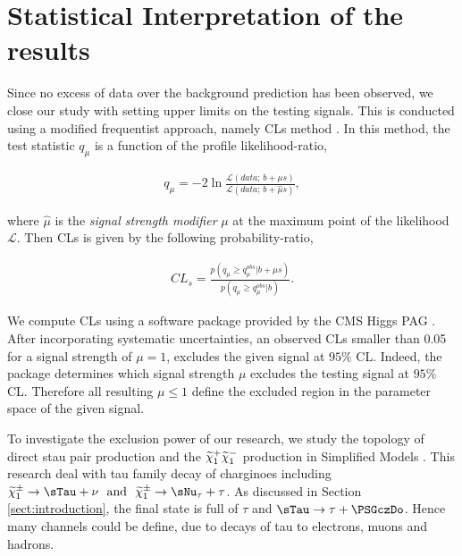 
\section[Statistics]{Statistical Interpretation of the results}\label{sect:stat}

\newcommand{\PSGcpmDo}{\ensuremath{\widetilde{\chi}_{1}^{\pm}}\xspace}


Since no excess of data over the background prediction has been observed, 
we close our study with setting upper limits on the testing signals.
This is conducted using a modified frequentist approach, namely CLs method \cite{read:CLs}.
In this method, the test statistic $q_\mu$ \cite{cowan:asymptoticCLs} is a function of the profile likelihood-ratio,

\begin{align}
q_\mu = -2 \ln \frac{\mathcal{L}(data ;\, b + \mu s)}{\mathcal{L}(data ;\, b + \hat{\mu} s)},
\end{align}

where $\hat\mu$ is the \textit{signal strength modifier} $\mu$ at the maximum point of the likelihood $\mathcal{L}$.
Then CLs is given by the following probability-ratio,

\begin{align}
CL_s = \frac{p(q_\mu \geq q_\mu^{obs} | b + \mu s )}{p(q_\mu \geq q_\mu^{obs} | b)}.
\end{align}
 
We compute CLs using a software package provided by the CMS Higgs PAG \cite{higgspag:software}.
After incorporating systematic uncertainties, an observed CLs smaller than 0.05 for a signal strength of $\mu = 1$, excludes the given signal at $95\%$ CL. Indeed, the package determines which signal strength $\mu$ excludes the testing signal at $95\%$ CL. Therefore all resulting $\mu \leq 1$ define the excluded region in the parameter space of the given signal. 


To investigate the exclusion power of our research, we study the topology of direct stau pair production and the $\widetilde{\chi}_{1}^{+}\widetilde{\chi}_{1}^{-}$ production in Simplified Models \cite{alves:sms}. 
This research deal with tau family decay of charginoes including 
$ \PSGcpmDo \rightarrow \sTau + \nu ~~\mathrm{and}~~  \PSGcpmDo \rightarrow \sNu_{\tau} + \tau $.
As discussed in Section \ref{sect:introduction}, the final state is full of $ \tau $ and $ \sTau \rightarrow \tau + \PSGczDo  $.
Hence many channels could be define, due to decays of tau to electrons, muons and hadrons.    


